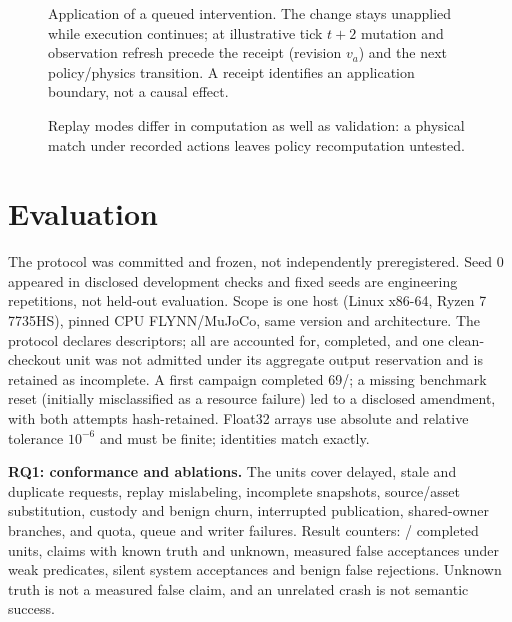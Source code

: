 \documentclass[letterpaper]{article}
\begin{document}
\begin{figure}[t]
\centering\resizebox{0.8\textwidth}{!}{}
\caption{Application of a queued intervention. The change stays unapplied while execution continues; at illustrative tick $t+2$ mutation and observation refresh precede the receipt (revision $v_a$) and the next policy/physics transition. A receipt identifies an application boundary, not a causal effect.}
\label{fig:authority}
\end{figure}
\begin{figure}[t]
\centering\footnotesize\renewcommand{\tabularxcolumn}[1]{>{\raggedright\arraybackslash}p{#1}}
\caption{Replay modes differ in computation as well as validation: a physical match under recorded actions leaves policy recomputation untested.}
\label{fig:matrix}
\end{figure}

\section{Evaluation}
The protocol was committed and frozen, not independently preregistered. Seed 0 appeared in disclosed development
checks and fixed seeds are engineering repetitions, not held-out evaluation. Scope is one host (Linux x86-64,
Ryzen 7 7735HS), pinned CPU FLYNN/MuJoCo, same version and architecture. The protocol declares \StudyDeclaredUnits{} descriptors; all
\StudyDeclaredUnits{} are accounted for, \StudyCompletedUnits{} completed, and one clean-checkout unit was not
admitted under its aggregate output reservation and is retained as incomplete. A first campaign completed 69/\StudyDeclaredUnits{}; a
missing benchmark reset (initially misclassified as a resource failure) led to a disclosed amendment, with both
attempts hash-retained. Float32 arrays use absolute and relative tolerance $10^{-6}$ and must be finite; identities
match exactly.

\textbf{RQ1: conformance and ablations.} The \FaultDeclaredUnits{} units cover delayed, stale and duplicate requests, replay mislabeling,
incomplete snapshots, source/asset substitution, custody and benign churn, interrupted publication, shared-owner
branches, and quota, queue and writer failures. Result counters: \FaultCompletedUnits{}/\FaultDeclaredUnits{}
completed units, \FaultBaselineKnownClaims{} claims with known truth and \FaultBaselineUnknownClaims{} unknown,
\FaultBaselineFalseAccepts{} measured false acceptances under weak predicates, \FaultSystemSilentAccepts{} silent
system acceptances and \FaultBenignFalseRejects{} benign false rejections. Unknown truth is not a measured false claim,
and an unrelated crash is not semantic success.
\end{document}
